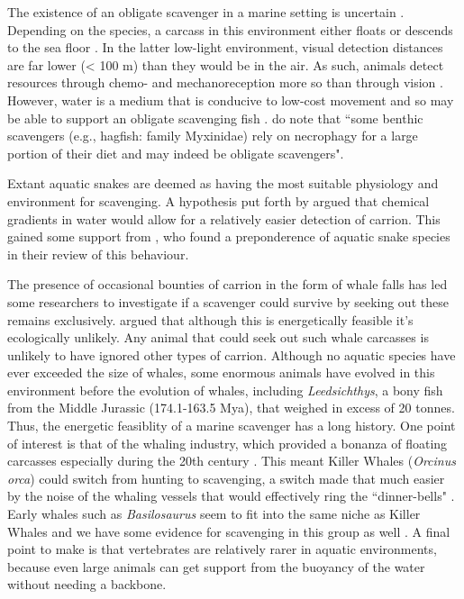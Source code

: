 \documentclass[a4paper,12pt]{article}
\begin{document}
The existence of an obligate scavenger in a marine setting is uncertain \citep{britton1994marine,smith2003ecology,ruxton2004energetic,ruxton2005searching}.
Depending on the species, a carcass in this environment either floats or descends to the sea floor \citep{Whitehead415}.
In the latter low-light environment, visual detection distances are far lower (< 100 m) than they would be in the air.
As such, animals detect resources through chemo- and mechanoreception more so than through vision \citep{ruxton2004energetic}.
However, water is a medium that is conducive to low-cost movement \citep{tucker1975energetic} and so may be able to support an obligate scavenging fish \citep{ruxton2004energetic,ruxton2005searching}.
\cite{beasley2015vertebrates} do note that ``some benthic scavengers (e.g., hagfish: family Myxinidae) rely on necrophagy for a large portion of their diet and may indeed be obligate scavengers".


Extant aquatic snakes are deemed as having the most suitable physiology and environment for scavenging.
A hypothesis put forth by \cite{sazima1990necrofagia} argued that chemical gradients in water would allow for a relatively easier detection of carrion.
This gained some support from \cite{devault2002scavenging}, who found a preponderence of aquatic snake species in their review of this behaviour.


The presence of occasional bounties of carrion in the form of whale falls has led some researchers to investigate if a scavenger could survive by seeking out these remains exclusively.
\cite{ruxton2005searching} argued that although this is energetically feasible it's ecologically unlikely.
Any animal that could seek out such whale carcasses is unlikely to have ignored other types of carrion.
Although no aquatic species have ever exceeded the size of whales, some enormous animals have evolved in this environment before the evolution of whales, including \textit{Leedsichthys}, a bony fish from the Middle Jurassic (174.1-163.5 Mya), that weighed in excess of 20 tonnes.
Thus, the energetic feasiblity of a marine scavenger has a long history.
One point of interest is that of the whaling industry, which provided a bonanza of floating carcasses especially during the 20th century \citep{Whitehead415}.
This meant Killer Whales (\textit{Orcinus orca}) could switch from hunting to scavenging, a switch made that much easier by the noise of the whaling vessels that would effectively ring the ``dinner-bells" \citep{Whitehead415}.
Early whales such as \textit{Basilosaurus} seem to fit into the same niche as Killer Whales and we have some evidence for scavenging in this group as well \citep{fahlke2012bite}.
A final point to make is that vertebrates are relatively rarer in aquatic environments, because even large animals can get support from the buoyancy of the water without needing a backbone.
\end{document}
